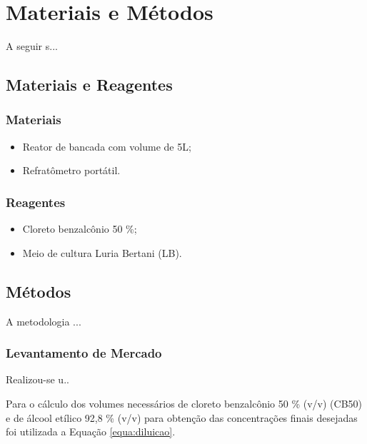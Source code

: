 \chapter{\textbf{Materiais e Métodos}}

A seguir s...

\section{Materiais e Reagentes}

\subsection{Materiais}

 \begin{itemize}
   \item Reator de bancada com volume de 5L;
   
   \item Refratômetro portátil.
   
 \end{itemize}

\subsection{Reagentes}

 \begin{itemize}
   \item Cloreto benzalcônio 50 \%;
   \item Meio de cultura Luria Bertani (LB).
   
 \end{itemize}

\section{Métodos}

A metodologia ...

\subsection{Levantamento de Mercado}
\label{sub:levantamentodemercado}

Realizou-se u..


Para o cálculo dos volumes necessários de cloreto benzalcônio 50 \% (v/v) (CB50) e de álcool etílico 92,8 \% (v/v) para obtenção das concentrações finais desejadas foi utilizada a Equação \ref{equa:diluicao}.


